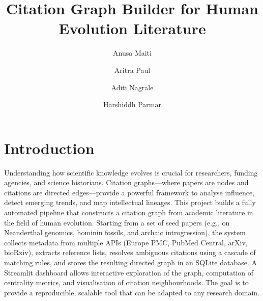 


\title{Citation Graph Builder for Human Evolution Literature}

\author{
    \small Anusa Maiti\and
    \small Aritra Paul\and
    \small Aditi Nagrale\and
    \small Harshiddh Parmar
    }





\maketitle




\section{Introduction}
Understanding how scientific knowledge evolves is crucial for researchers, funding agencies, and science historians. Citation graphs—where papers are nodes and citations are directed edges—provide a powerful framework to analyse influence, detect emerging trends, and map intellectual lineages. This project builds a fully automated pipeline that constructs a citation graph from academic literature in the field of human evolution. Starting from a set of seed papers (e.g., on Neanderthal genomics, hominin fossils, and archaic introgression), the system collects metadata from multiple APIs (Europe PMC, PubMed Central, arXiv, bioRxiv), extracts reference lists, resolves ambiguous citations using a cascade of matching rules, and stores the resulting directed graph in an SQLite database. A Streamlit dashboard allows interactive exploration of the graph, computation of centrality metrics, and visualisation of citation neighbourhoods. The goal is to provide a reproducible, scalable tool that can be adapted to any research domain.

